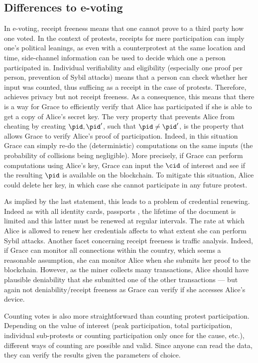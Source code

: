  
\subsection{Differences to e-voting}
In e-voting, receipt freeness means that one cannot prove to a third party how one voted. 
In the context of protests, receipts for mere participation can imply one's political leanings, as even with a counterprotest at the same location and time, side-channel information can be used to decide which one a person participated in. 
Individual verifiability and eligibility (especially one proof per person, prevention of Sybil attacks) means that a person can check whether her input was counted, thus sufficing as a receipt in the case of protests.  
Therefore, \CROCUS achieves privacy but not receipt freeness.
As a consequence, this means that there is a way for Grace to efficiently verify that Alice has participated if she is able to get a copy of Alice's secret key. 
The very property that prevents Alice from cheating by creating \(\pid, \pid'\), such that \(\pid \neq \pid'\), is the property that
allows Grace to verify Alice's proof of participation.  
Indeed, in this situation Grace can simply re-do the (deterministic) computations on the same inputs (the probability of collisions being negligible).  
More precisely, if Grace can perform computations using Alice's key, Grace can input the \(\cid\) of interest and see if the resulting \(\pid\) is available on the blockchain.  
To mitigate this situation, Alice could delete her key, in which case she cannot participate in any future protest.  

As implied by the last statement, this leads to a problem of credential renewing.  
Indeed as with all identity cards, passports \etc, the lifetime of the document is limited and this latter must be renewed at regular intervals.  
The rate at which Alice is allowed to renew her credentials affects to what extent she can perform Sybil attacks. 
Another facet concerning receipt freeness is traffic analysis. 
Indeed, if Grace can monitor all connections within the country, which seems a reasonable assumption, she can monitor Alice when she submits her proof to the blockchain. 
However, as the miner collects many transactions, Alice should have plausible deniability that she submitted one of the other transactions --- but again not deniability/receipt freeness as Grace can verify if she accesses Alice's device.

Counting votes is also more straightforward than counting protest participation. 
Depending on the value of interest (\eg peak participation, total participation, individual sub-protests or counting participation only once for the cause, etc.), different ways of counting are
possible and valid. 
Since anyone can read the data, they can verify the results given the parameters of choice.

